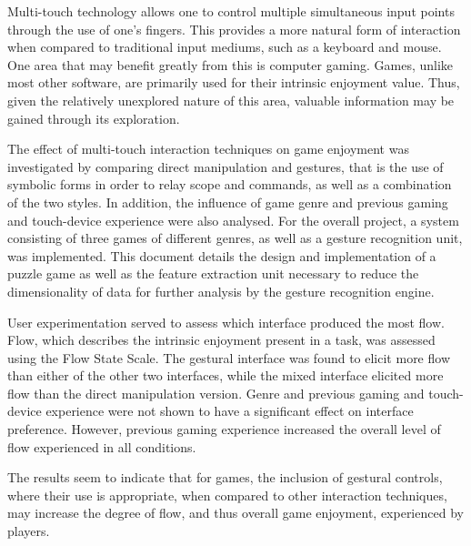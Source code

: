 Multi-touch technology allows one to control multiple simultaneous input points through the use of one's fingers. This provides a more natural form of interaction when compared to traditional input mediums, such as a keyboard and mouse. One area that may benefit greatly from this is computer gaming. Games, unlike most other software, are primarily used for their intrinsic enjoyment value. Thus, given the relatively unexplored nature of this area, valuable information may be gained through its exploration.

The effect of multi-touch interaction techniques on game enjoyment was investigated by comparing direct manipulation and gestures, that is the use of symbolic forms in order to relay scope and commands, as well as a combination of the two styles. In addition, the influence of game genre and previous gaming and touch-device experience were also analysed. For the overall project, a system consisting of three games of different genres, as well as a gesture recognition unit, was implemented. This document details the design and implementation of a puzzle game as well as the feature extraction unit necessary to reduce the dimensionality of data for further analysis by the gesture recognition engine.

User experimentation served to assess which interface produced the most flow. Flow, which describes the intrinsic enjoyment present in a task, was assessed using the Flow State Scale. The gestural interface was found to elicit more flow than either of the other two interfaces, while the mixed interface elicited more flow than the direct manipulation version. Genre and previous gaming and touch-device experience were not shown to have a significant effect on interface preference. However, previous gaming experience increased the overall level of flow experienced in all conditions.

The results seem to indicate that for games, the inclusion of gestural controls, where their use is appropriate, when compared to other interaction techniques, may increase the degree of flow, and thus overall game enjoyment, experienced by players.


